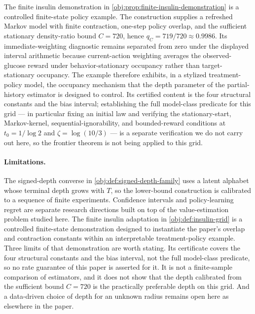 The finite insulin demonstration in \cref{obj:prop:finite-insulin-demonstration} is a controlled finite-state policy example. The construction supplies a refreshed Markov model with finite contraction, one-step policy overlap, and the sufficient stationary density-ratio bound \(C=720\), hence \(q_C=719/720\approx0.9986\). Its immediate-weighting diagnostic remains separated from zero under the displayed interval arithmetic because current-action weighting averages the observed-glucose reward under behavior-stationary occupancy rather than target-stationary occupancy. The example therefore exhibits, in a stylized treatment-policy model, the occupancy mechanism that the depth parameter of the partial-history estimator is designed to control. Its certified content is the four structural constants and the bias interval; establishing the full model-class predicate for this grid --- in particular fixing an initial law and verifying the stationary-start, Markov-kernel, sequential-ignorability, and bounded-reward conditions at \(t_0=1/\log2\) and \(\zeta=\log(10/3)\) --- is a separate verification we do not carry out here, so the frontier theorem is not being applied to this grid.

\paragraph{Limitations.}
The signed-depth converse in \cref{obj:def:signed-depth-family} uses a latent alphabet whose terminal depth grows with \(T\), so the lower-bound construction is calibrated to a sequence of finite experiments. Confidence intervals and policy-learning regret are separate research directions built on top of the value-estimation problem studied here. The finite insulin adaptation in \cref{obj:def:insulin-grid} is a controlled finite-state demonstration designed to instantiate the paper's overlap and contraction constants within an interpretable treatment-policy example. Three limits of that demonstration are worth stating. Its certificate covers the four structural constants and the bias interval, not the full model-class predicate, so no rate guarantee of this paper is asserted for it. It is not a finite-sample comparison of estimators, and it does not show that the depth calibrated from the sufficient bound \(C=720\) is the practically preferable depth on this grid. And a data-driven choice of depth for an unknown radius remains open here as elsewhere in the paper.
